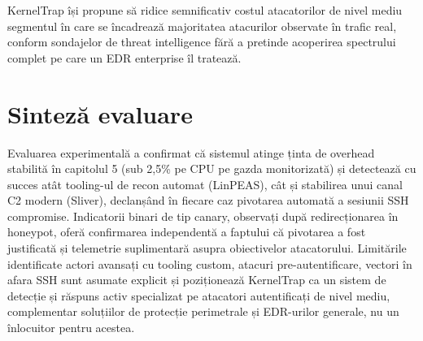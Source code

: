 KernelTrap își propune să ridice semnificativ costul atacatorilor de nivel
mediu segmentul în care se încadrează majoritatea atacurilor observate în
trafic real, conform sondajelor de threat intelligence fără a pretinde
acoperirea spectrului complet pe care un EDR enterprise îl tratează.

\section{Sinteză evaluare}

Evaluarea experimentală a confirmat că sistemul atinge ținta de
overhead stabilită în capitolul 5 (sub 2,5\% pe CPU pe gazda monitorizată)
și detectează cu succes atât tooling-ul de recon automat (LinPEAS), cât și
stabilirea unui canal C2 modern (Sliver), declanșând în fiecare caz
pivotarea automată a sesiunii SSH compromise.
Indicatorii binari de tip canary, observați după redirecționarea în
honeypot, oferă confirmarea independentă a faptului că pivotarea a fost
justificată și telemetrie suplimentară asupra obiectivelor atacatorului.
Limitările identificate actori avansați cu tooling custom, atacuri
pre-autentificare, vectori în afara SSH sunt asumate explicit și
poziționează KernelTrap ca un sistem de detecție și răspuns activ
specializat pe atacatori autentificați de nivel mediu, complementar
soluțiilor de protecție perimetrale și EDR-urilor generale, nu un
înlocuitor pentru acestea.
